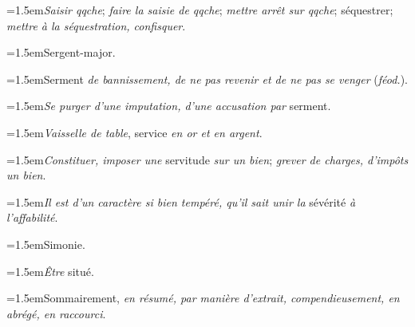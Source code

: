 \par{\dictfontsize\hangindent=1.5em\noindent \textit{Saisir qqche}; \textit{faire la saisie de qqche}; \textit{mettre arrêt sur qqche}; séquestrer; \textit{mettre à la séquestration, confisquer}. \par}
\par{\dictfontsize\hangindent=1.5em\noindent Sergent-major. \par}
\par{\dictfontsize\hangindent=1.5em\noindent Serment \textit{de bannissement, de ne pas revenir et de ne pas se venger} (\textit{féod.}). \par}
\par{\dictfontsize\hangindent=1.5em\noindent \textit{Se purger d’une imputation, d’une accusation par} serment. \par}
\par{\dictfontsize\hangindent=1.5em\noindent \textit{Vaisselle de table}, service \textit{en or et en argent}. \par}
\par{\dictfontsize\hangindent=1.5em\noindent \textit{Constituer, imposer une} servitude \textit{sur un bien}; \textit{grever de charges, d’impôts un bien}. \par}
\par{\dictfontsize\hangindent=1.5em\noindent \textit{Il est d’un caractère si bien tempéré, qu’il sait unir la} sévérité \textit{à l’affabilité}. \par}
\par{\dictfontsize\hangindent=1.5em\noindent Simonie. \par}
\par{\dictfontsize\hangindent=1.5em\noindent \textit{Être} situé. \par}
\par{\dictfontsize\hangindent=1.5em\noindent Sommairement, \textit{en résumé, par manière d’extrait, compendieusement, en abrégé, en raccourci}. \par}
